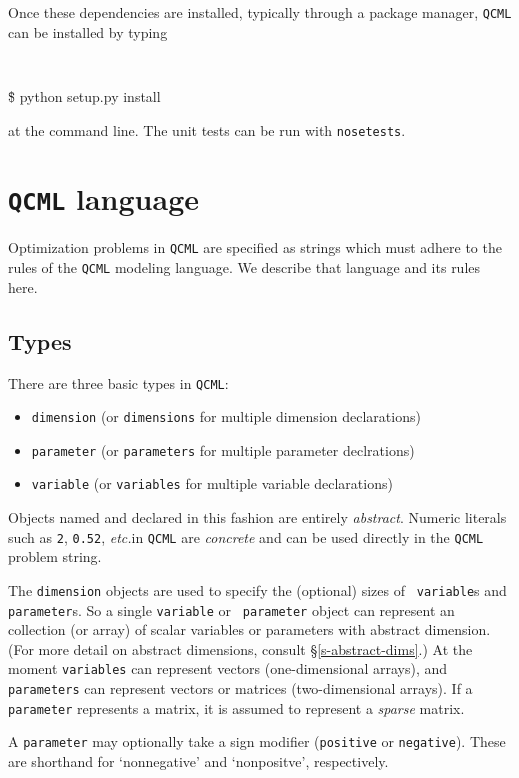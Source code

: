 \documentclass[11pt]{article}
\def\qcml{\texttt{QCML}\xspace}
\newcommand{\etc}{{\it etc.}}
\begin{document}
Once these dependencies are installed, typically through a package manager,
\qcml can be installed by typing
{\tt
\begin{tabbing}
  \qquad \= \$ python setup.py install
\end{tabbing}
}
\noindent at the command line. The unit tests can be run with {\tt nosetests}.

\section{\qcml language}
Optimization problems in \qcml are specified as strings which must adhere to 
the rules of the \qcml modeling language. We describe that language and its
rules here.

\subsection{Types}
There are three basic types in \qcml:
\begin{itemize}
\item {\tt dimension} (or {\tt dimensions} for multiple dimension declarations)
\item {\tt parameter} (or {\tt parameters} for multiple parameter declrations)
\item {\tt variable} (or {\tt variables} for multiple variable declarations)
\end{itemize}
Objects named and declared in this fashion are entirely \emph{abstract}.
Numeric literals such as {\tt 2}, {\tt 0.52}, \etc in \qcml are
\emph{concrete} and can be used directly in the \qcml problem string. 

The {\tt dimension} objects are used to specify the (optional) sizes of {\tt
variable}s and {\tt parameter}s. So a single {\tt variable} or {\tt
parameter} object can represent an collection (or array) of scalar variables
or parameters with abstract dimension. (For more detail on abstract
dimensions, consult \S\ref{s-abstract-dims}.) At the moment {\tt variables}
can represent vectors (one-dimensional arrays), and {\tt parameters} can
represent vectors or matrices (two-dimensional arrays). If a {\tt parameter}
represents a matrix, it is assumed to represent a \emph{sparse} matrix.

A {\tt parameter} may optionally take a sign modifier ({\tt positive} or 
{\tt negative}). These are shorthand for `nonnegative' and `nonpositve', 
respectively.
\end{document}
